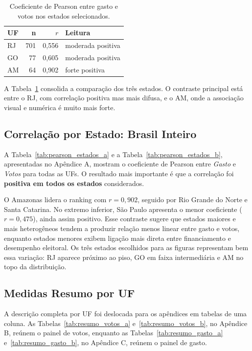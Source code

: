 \documentclass[conference]{IEEEtran}
\begin{document}
\begin{table}[!t]
  \centering
  \caption{Coeficiente de Pearson entre gasto e votos nos estados selecionados.}
  \label{tab:pearson_selecionados}
  \footnotesize
  \begin{tabular}{lrrl}
    \toprule
    \textbf{UF} & \textbf{n} & \textbf{$r$} & \textbf{Leitura} \\
    \midrule
    RJ & 701 & 0,556 & moderada positiva \\
    GO & 77 & 0,605 & moderada positiva \\
    AM & 64 & 0,902 & forte positiva \\
    \bottomrule
  \end{tabular}
\end{table}

A Tabela~\ref{tab:pearson_selecionados} consolida a comparação dos três
estados. O contraste principal está entre o RJ, com correlação positiva mas
mais difusa, e o AM, onde a associação visual e numérica é muito mais forte.

\subsection{Correlação por Estado: Brasil Inteiro}

A Tabela~\ref{tab:pearson_estados_a} e a
Tabela~\ref{tab:pearson_estados_b}, apresentadas no Apêndice A, mostram o
coeficiente de Pearson entre \textit{Gasto} e \textit{Votos} para todas as
UFs. O resultado mais importante é que a correlação foi \textbf{positiva em
todos os estados} considerados.

O Amazonas lidera o ranking com $r = 0{,}902$, seguido por Rio Grande do
Norte e Santa Catarina. No extremo inferior, São Paulo apresenta o menor
coeficiente ($r = 0{,}475$), ainda assim positivo. Esse contraste sugere que
estados maiores e mais heterogêneos tendem a produzir relação menos linear
entre gasto e votos, enquanto estados menores exibem ligação mais direta
entre financiamento e desempenho eleitoral. Os três estados escolhidos para
as figuras representam bem essa variação: RJ aparece próximo ao piso,
GO em faixa intermediária e AM no topo da distribuição.

\subsection{Medidas Resumo por UF}

A descrição completa por UF foi deslocada para os apêndices em tabelas de
uma coluna. As Tabelas~\ref{tab:resumo_votos_a} e~\ref{tab:resumo_votos_b},
no Apêndice B, reúnem o painel de votos, enquanto as
Tabelas~\ref{tab:resumo_gasto_a} e~\ref{tab:resumo_gasto_b}, no Apêndice C,
reúnem o painel de gasto.
\end{document}
